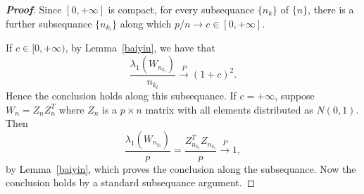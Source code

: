 \documentclass[review]{elsarticle}
\theoremstyle{plain}
\theoremstyle{definition}
\theoremstyle{remark}
\begin{document}
\begin{proof}[\textbf{Proof}]
    Since $[0,+\infty]$ is compact, for every subsequance $\{n_{k}\}$ of $\{n\}$, there is a further subsequance $\{n_{k_l}\}$ along which $p/n\to c\in [0,+\infty]$.

    If $c\in [0,+\infty)$, by Lemma~\ref{baiyin}, we have that
    $$
    \frac{\lambda_1(W_{n_{k_l}})}{n_{k_l}}\xrightarrow{P}{(1+c)}^2.
    $$
    Hence the conclusion holds along this subsequance. If $c=+\infty$, suppose $W_n=Z_n Z_n^T$ where $Z_n$ is a $p\times n$ matrix with all elements distributed as $N(0,1)$. Then
    $$
    \frac{\lambda_1(W_{n_{k_l}})}{p}=\frac{Z_{n_{k_l}}^T Z_{n_{k_l}}}{p}\xrightarrow{P} 1,
    $$
    by Lemma~\ref{baiyin}, which proves the conclusion along the subsequance. Now the conclusion holds by a standard subsequance argument.
\end{proof}
\end{document}
